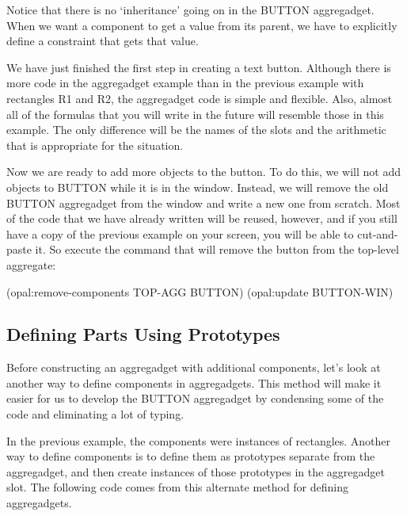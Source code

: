 Notice that there is no `inheritance' going on in the BUTTON
aggregadget.  When we want a component to get a value from its parent,
we have to explicitly define a constraint that gets that value.

We have just finished the first step in creating a text button.
Although there is more code in the aggregadget example than in the
previous example with rectangles R1 and R2, the aggregadget code is
simple and flexible.  Also, almost all of the formulas that you will
write in the future will resemble those in this example.  The only
difference will be the names of the slots and the arithmetic that is
appropriate for the situation.

Now we are ready to add more objects to the button.  To do this, we will
not add objects to BUTTON while it is in the window.  Instead, we will
remove the old BUTTON aggregadget from the window and write a new one from
scratch.  Most of the code that we have already written will be reused,
however, and if you still have a copy of the previous example on your screen,
you will be able to cut-and-paste it.  So execute the command that
will remove the button from the top-level aggregate:

\begin{programexample}
(opal:remove-components TOP-AGG BUTTON)
(opal:update BUTTON-WIN)
\end{programexample}


\subsection{Defining Parts Using Prototypes}

Before constructing an aggregadget with additional components, let's
look at another way to define components in aggregadgets.  This method
will make it easier for us to develop the BUTTON aggregadget by
condensing some of the code and eliminating a lot of typing.

In the previous example, the components were instances of rectangles.
Another way to define components is to define them as prototypes
separate from the aggregadget, and then create instances of those
prototypes in the aggregadget  slot.  The following code
comes from this alternate method for defining aggregadgets.

